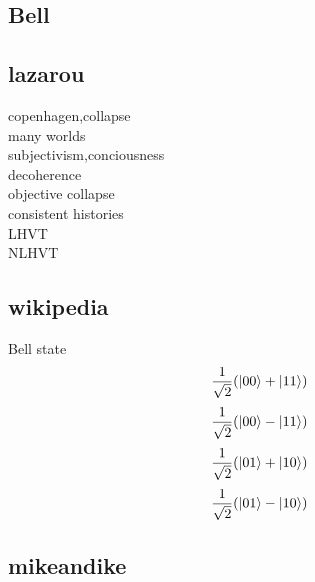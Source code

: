 \documentclass[12pt] {article}
\begin{document}
\subsection*{Bell}
\subsection*{lazarou}
copenhagen,collapse\\many worlds\\subjectivism,conciousness\\decoherence\\objective collapse\\consistent histories\\LHVT\\NLHVT
\subsection*{wikipedia}
Bell state
\[\frac{1}{\sqrt{2}}\qty(\ket{00}+\ket{11})\]
\[\frac{1}{\sqrt{2}}\qty(\ket{00}-\ket{11})\]
\[\frac{1}{\sqrt{2}}\qty(\ket{01}+\ket{10})\]
\[\frac{1}{\sqrt{2}}\qty(\ket{01}-\ket{10})\]
\newpage
\subsection*{mikeandike}
\end{document}
